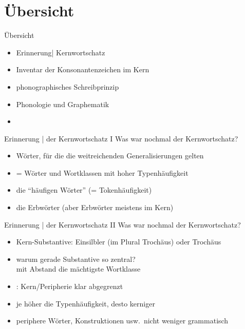 \section{Übersicht}

\begin{frame}
  {Übersicht}
  \pause
  \begin{itemize}[<+->]
    \item Erinnerung| Kernwortschatz
    \item Inventar der Konsonantenzeichen im Kern
    \item phonographisches Schreibprinzip
    \item Phonologie und Graphematik
    \item \citet[Kapitel~15]{Schaefer2018b}
  \end{itemize}
\end{frame}

\begin{frame}
  {Erinnerung | der Kernwortschatz I}
  \pause
  Was war nochmal der Kernwortschatz?\\
  \Halbzeile
  \pause
  \begin{itemize}[<+->]
    \item Wörter, für die \alert{die weitreichenden Generalisierungen gelten}
    \item = Wörter und Wortklassen mit \alert{hoher Typenhäufigkeit}
    \item {} die "`häufigen Wörter"' (= Tokenhäufigkeit)
    \item {} die Erbwörter (aber Erbwörter meistens im Kern)
  \end{itemize}
\end{frame}

\begin{frame}
  {Erinnerung | der Kernwortschatz II}
  \pause
  Was war nochmal der Kernwortschatz?\\
  \Halbzeile
  \pause
  \begin{itemize}[<+->]
    \item Kern-Substantive: Einsilbler (im Plural Trochäus) oder Trochäus
    \item warum gerade Substantive so zentral?\\
      \alert{mit Abstand die mächtigste Wortklasse}
      \Halbzeile
    \item {}: Kern\slash Peripherie klar abgegrenzt
    \item je höher die Typenhäufigkeit, desto kerniger
    \item periphere Wörter, Konstruktionen usw.\ \alert{nicht weniger grammatisch}
  \end{itemize}
\end{frame}


